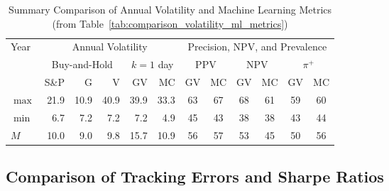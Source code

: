 \documentclass{article}
\begin{document}

\begin{table}[!ht]
    \centering
    \caption{Summary Comparison of Annual Volatility and Machine Learning 
    Metrics (from Table~\ref{tab:comparison_volatility_ml_metrics})}
    \medskip
    \begin{tabular}{l || rrr || rr || cc||cc||cc}
    \hline
    \multirow{3}{*}{Year} & \multicolumn{5}{c||}{Annual Volatility} & \multicolumn{6}{c}{Precision, NPV, and Prevalence} \\
    \cline{2-12}
    & \multicolumn{3}{c||}{Buy-and-Hold}   
& \multicolumn{2}{c||}{$k=1$  day} 
& \multicolumn{2}{c}{PPV}  & \multicolumn{2}{c}{NPV} & \multicolumn{2}{c}{$\pi^+$}   \\ \cline{2-12}
 & S\&P & G & V  & GV  & MC  & GV & MC  & GV  & MC & GV & MC \\ \hline
        $\max$ & 21.9 & \cellcolor{green!25}10.9 & \cellcolor{red!25}40.9 & \cellcolor{red!25}39.9 & 33.3 & 63 & \cellcolor{green!25}67 & \cellcolor{green!25}68 & 61 & 59 & \cellcolor{green!25}60 \\ 
        $\min$ & \cellcolor{green!25}6.7 & \cellcolor{red!25}7.2 & \cellcolor{red!25}7.2 & \cellcolor{red!25}7.2 & 4.9 & \cellcolor{green!25}45 & 43 & \cellcolor{green!25}38 & \cellcolor{green!25}38 & 43 & \cellcolor{green!25}44 \\ 
        $M$ & \cellcolor{red!25}10.0 & \cellcolor{green!25}9.0 & 9.8 & \cellcolor{red!25}15.7 & 10.9 & 56 & \cellcolor{green!25}57 & \cellcolor{green!25}53 & 45 & 50 & \cellcolor{green!25}56 \\ 
        \hline
    \end{tabular}
    \label{tab:comparison_volatility_ml_metrics_summary}
\end{table}


\subsection{Comparison of Tracking Errors and Sharpe Ratios}
\end{document}
